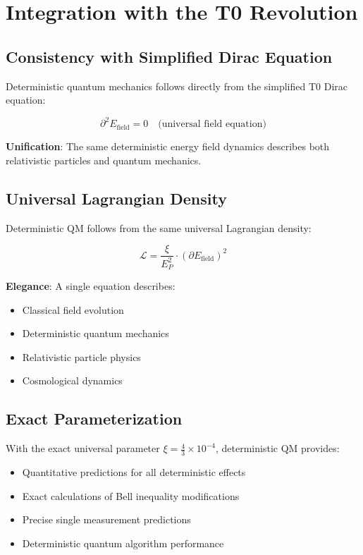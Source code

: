 \documentclass[12pt,a4paper]{article}
\newcommand{\xipar}{\xi}
\newcommand{\EPlanck}{E_P}
\theoremstyle{definition}
\theoremstyle{remark}
\begin{document}
	\section{Integration with the T0 Revolution}
	
	\subsection{Consistency with Simplified Dirac Equation}
	
	Deterministic quantum mechanics follows directly from the simplified T0 Dirac equation:
	
	\begin{equation}
		\partial^2 E_{\text{field}} = 0 \quad \text{(universal field equation)}
	\end{equation}
	
	\textbf{Unification}: The same deterministic energy field dynamics describes both relativistic particles and quantum mechanics.
	
	\subsection{Universal Lagrangian Density}
	
	Deterministic QM follows from the same universal Lagrangian density:
	
	\begin{equation}
		\mathcal{L} = \frac{\xipar}{\EPlanck^2} \cdot (\partial E_{\text{field}})^2
	\end{equation}
	
	\textbf{Elegance}: A single equation describes:
	\begin{itemize}
		\item Classical field evolution
		\item Deterministic quantum mechanics
		\item Relativistic particle physics
		\item Cosmological dynamics
	\end{itemize}
	
	\subsection{Exact Parameterization}
	
	With the exact universal parameter $\xipar = \frac{4}{3} \times 10^{-4}$, deterministic QM provides:
	
	\begin{itemize}
		\item Quantitative predictions for all deterministic effects
		\item Exact calculations of Bell inequality modifications
		\item Precise single measurement predictions
		\item Deterministic quantum algorithm performance
	\end{itemize}
\end{document}

